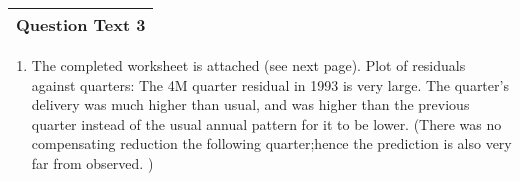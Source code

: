 \documentclass[a4paper,12pt]{article}
\begin{document}
\begin{table}[ht!]
 \centering
 \begin{tabular}{|p{15cm}|}
 \hline  
Question Text 3 
\\ \hline
  \end{tabular}
\end{table}\begin{enumerate}
    \item The completed worksheet is attached (see next page). Plot of residuals against quarters:
The 4M quarter residual in 1993 is very large. The quarter’s delivery was much higher than
usual, and was higher than the previous quarter instead of the usual annual pattern for it to
be lower. (There was no compensating reduction the following quarter;hence the prediction is
also very far from observed. )
\end{enumerate}
\end{document}

